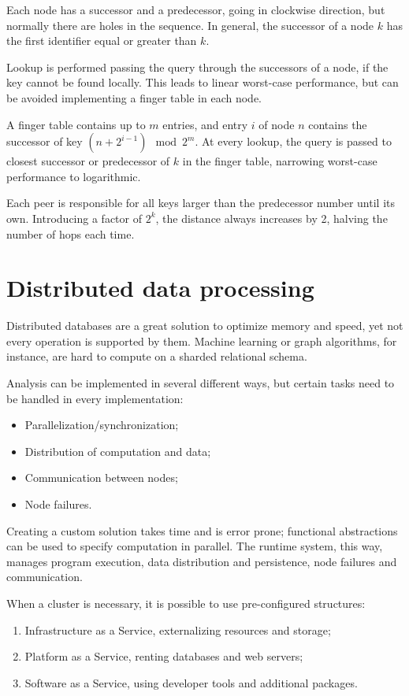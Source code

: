 Each node has a successor and a predecessor, going in clockwise direction, but normally there are holes in the sequence. In general, the successor of a node $k$ has the first identifier equal or greater than $k$.

Lookup is performed passing the query through the successors of a node, if the key cannot be found locally. This leads to linear worst-case performance, but can be avoided implementing a finger table in each node. 

A finger table contains up to $m$ entries, and entry $i$ of node $n$ contains the successor of key $(n + 2^{i-1}) \mod 2^m$. At every lookup, the query is passed to closest successor or predecessor of $k$ in the finger table, narrowing worst-case performance to logarithmic.

Each peer is responsible for all keys larger than the predecessor number until its own. Introducing a factor of $2^k$, the distance always increases by 2, halving the number of hops each time.

\section{Distributed data processing}
Distributed databases are a great solution to optimize memory and speed, yet not every operation is supported by them. Machine learning or graph algorithms, for instance, are hard to compute on a sharded relational schema.

Analysis can be implemented in several different ways, but certain tasks need to be handled in every implementation:
\begin{itemize}
	\item Parallelization/synchronization;
	\item Distribution of computation and data;
	\item Communication between nodes;
	\item Node failures.
\end{itemize}

Creating a custom solution takes time and is error prone; functional abstractions can be used to specify computation in parallel. The runtime system, this way, manages program execution, data distribution and persistence, node failures and communication.

When a cluster is necessary, it is possible to use pre-configured structures:
\begin{enumerate}
	\item Infrastructure as a Service, externalizing resources and storage;
	\item Platform as a Service, renting databases and web servers;
	\item Software as a Service, using developer tools and additional packages.
\end{enumerate}


